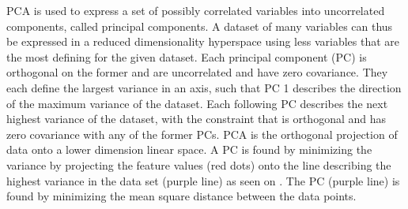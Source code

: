 PCA is used to express a set of possibly correlated variables into uncorrelated components, called principal components. A dataset of many variables can thus be expressed in a reduced dimensionality hyperspace using less variables that are the most defining for the given dataset. Each principal component (PC) is orthogonal on the former and are uncorrelated and have zero covariance. They each define the largest variance in an axis, such that PC 1 describes the direction of the maximum variance of the dataset. Each following PC describes the next highest variance of the dataset, with the constraint that is orthogonal and has zero covariance with any of the former PCs.
PCA is the orthogonal projection of data onto a lower dimension linear space. A PC is found by minimizing the variance by projecting the feature values (red dots) onto the line describing the highest variance in the data set (purple line) as seen on . The PC (purple line) is found by minimizing the mean square distance between the data points. 

